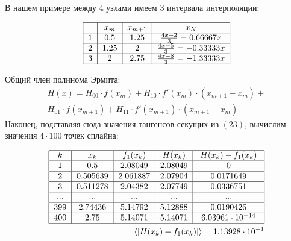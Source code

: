 \documentclass[a4paper, 14pt]{article}
\begin{document}
{В нашем примере между 4 узлами имеем 3 интервала интерполяции:
\begin{center}
    \begin{align}
        \begin{tabular}{|c|c|c|c|}
            \hline
             & $x_m$ & $x_{m+1}$ & $x_N$\\
            \hline
            1 &  0.5 & 1.25 & $\frac{4x-2}{3}=0.66667x$\\
            \hline
            2 &  1.25 &  2 & $\frac{4x-5}{3}=-0.33333x$\\
            \hline
            3 &  2 & 2.75 & $\frac{4x-8}{3}=-1.33333x$\\
            \hline
        \end{tabular}
    \end{align}
\end{center}
Общий член полинома Эрмита:
\begin{align}
    H(x) = H_{00}\cdot f(x_m) + H_{10}\cdot f'(x_m)\cdot(x_{m+1}-x_m) + \\H_{01}\cdot f(x_{m+1}) + H_{11}\cdot f'(x_{m+1})\cdot(x_{m+1}-x_m)
\end{align}
Наконец, подставляя сюда значения тангенсов секущих из $(23)$, вычислим значения $4\cdot100$ точек сплайна:
\begin{center} %
\begin{align}
    \begin{tabular}{|c|c|c|c|c|}
        \hline
        $k$ & $x_k$ & $f_1(x_k)$ & $H(x_k)$ & $|H(x_k)-f_1(x_k)|$ \\
        \hline
        1 & 0.5      & 2.08049 & 2.08049 & 0 \\
        \hline
        2 & 0.505639 & 2.061887& 2.07904 &  0.0171649 \\
        \hline
        3 & 0.511278 & 2.04382 & 2.07749 &  0.0336751 \\
        \hline
        ... & ... & ... & ... &  ... \\
        \hline
        399 & 2.74436   & 5.14792 &	5.12888 &  0.0190426 \\
        \hline
        400 & 2.75 & 5.14071  & 5.14071 &  $6.03961\cdot10^{-14}$\\
        \hline
    \end{tabular}\\
    \langle|H(x_k)-f_1(x_k)|\rangle=1.13928\cdot10^{-1}
\end{align}
\end{center}
\newpage

}
\end{document}
